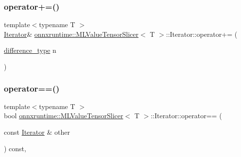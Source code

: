 \mbox{\label{classonnxruntime_1_1MLValueTensorSlicer_1_1Iterator_a31b88ce78e2603bb70fd20b87b80fe45}} 
\subsubsection{\texorpdfstring{operator+=()}{operator+=()}}
{\footnotesize\ttfamily template$<$typename T $>$ \\
\mbox{\hyperlink{classonnxruntime_1_1MLValueTensorSlicer_1_1Iterator}{Iterator}}\& \mbox{\hyperlink{classonnxruntime_1_1MLValueTensorSlicer}{onnxruntime\+::\+M\+L\+Value\+Tensor\+Slicer}}$<$ T $>$\+::Iterator\+::operator+= (\begin{DoxyParamCaption}\item[{\mbox{\hyperlink{classonnxruntime_1_1MLValueTensorSlicer_1_1Iterator_a927741252788936cc33b0c46e86ad646}{difference\+\_\+type}}}]{n }\end{DoxyParamCaption})\hspace{0.3cm}{\ttfamily [inline]}}

\mbox{\label{classonnxruntime_1_1MLValueTensorSlicer_1_1Iterator_a6aea224055665bfbb5f538060a4cdd75}} 
\subsubsection{\texorpdfstring{operator==()}{operator==()}}
{\footnotesize\ttfamily template$<$typename T $>$ \\
bool \mbox{\hyperlink{classonnxruntime_1_1MLValueTensorSlicer}{onnxruntime\+::\+M\+L\+Value\+Tensor\+Slicer}}$<$ T $>$\+::Iterator\+::operator== (\begin{DoxyParamCaption}\item[{const \mbox{\hyperlink{classonnxruntime_1_1MLValueTensorSlicer_1_1Iterator}{Iterator}} \&}]{other }\end{DoxyParamCaption}) const\hspace{0.3cm}{\ttfamily [inline]}, {\ttfamily [noexcept]}}



